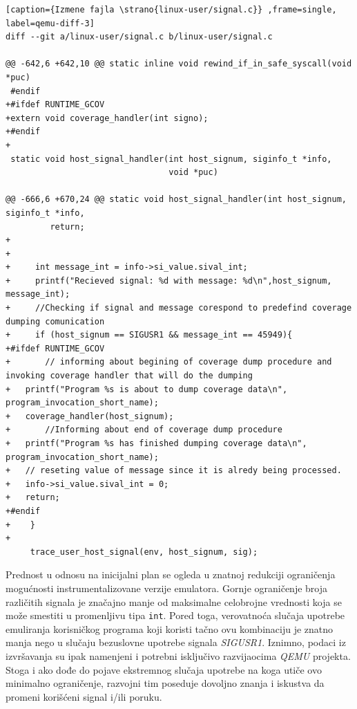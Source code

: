 \documentclass[12pt,oneside]{memoir}
\newcommand{\kod}[1]{\texttt{#1}}
\newcommand{\strano}[1]{\textit{#1}}
\begin{document}
\begin{lstlisting}[caption={Izmene fajla \strano{linux-user/signal.c}} ,frame=single, label=qemu-diff-3]
diff --git a/linux-user/signal.c b/linux-user/signal.c

@@ -642,6 +642,10 @@ static inline void rewind_if_in_safe_syscall(void *puc)
 #endif
+#ifdef RUNTIME_GCOV
+extern void coverage_handler(int signo);
+#endif
+
 static void host_signal_handler(int host_signum, siginfo_t *info,
                                 void *puc)

@@ -666,6 +670,24 @@ static void host_signal_handler(int host_signum, siginfo_t *info,
         return;
+
+     
+     int message_int = info->si_value.sival_int;
+     printf("Recieved signal: %d with message: %d\n",host_signum, message_int);
+     //Checking if signal and message corespond to predefind coverage dumping comunication
+     if (host_signum == SIGUSR1 && message_int == 45949){
+#ifdef RUNTIME_GCOV
+       // informing about begining of coverage dump procedure and invoking coverage handler that will do the dumping
+	printf("Program %s is about to dump coverage data\n", program_invocation_short_name);
+	coverage_handler(host_signum);
+       //Informing about end of coverage dump procedure
+	printf("Program %s has finished dumping coverage data\n", program_invocation_short_name);
+	// reseting value of message since it is alredy being processed.
+	info->si_value.sival_int = 0;
+	return;
+#endif
+    }
+
     trace_user_host_signal(env, host_signum, sig);
\end{lstlisting}

Prednost u odnosu na inicijalni plan se ogleda u znatnoj redukciji ograničenja mogućnosti instrumentalizovane verzije emulatora. Gornje ograničenje broja različitih signala je značajno manje od maksimalne celobrojne vrednosti koja se može smestiti u promenljivu tipa \kod{int}. Pored toga, verovatnoća slučaja upotrebe emuliranja korisničkog programa koji koristi tačno ovu kombinaciju je znatno manja nego u slučaju bezuslovne upotrebe signala \strano{SIGUSR1}. Iznimno, podaci iz izvršavanja su ipak namenjeni i potrebni isključivo razvijaocima \strano{QEMU} projekta. Stoga i ako dođe do pojave ekstremnog slučaja upotrebe na koga utiče ovo minimalno ograničenje, razvojni tim poseduje dovoljno znanja i iskustva da promeni korišćeni signal i/ili poruku. \\
\end{document}
